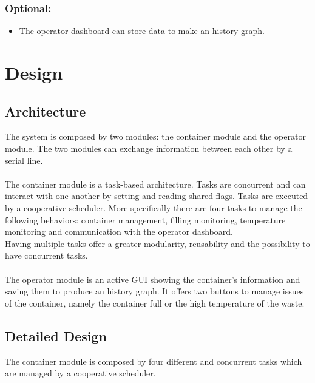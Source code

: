 \documentclass[a4paper,12pt]{report}
\begin{document}
        \subsection{Optional:}
            
            \begin{itemize}
                \item The operator dashboard can store data to make an history graph.
            \end{itemize}

\chapter{Design}

    \section{Architecture}

        The system is composed by two modules: the container module and the operator module.
        The two modules can exchange information between each other by a serial line.\\\\
        The container module is a task-based architecture. Tasks are concurrent and can interact with one another by setting and reading shared flags. Tasks are executed by a cooperative scheduler.
        More specifically there are four tasks to manage the following behaviors: container management, filling monitoring, temperature monitoring and communication with the operator dashboard.\\
        Having multiple tasks offer a greater modularity, reusability and the possibility to have concurrent tasks.\\\\
        The operator module is an active GUI showing the container's information and saving them to produce an history graph.
        It offers two buttons to manage issues of the container, namely the container full or the high temperature of the waste.
    
    \section{Detailed Design}

        The container module is composed by four different and concurrent tasks which are managed by a cooperative scheduler. 
\end{document}
